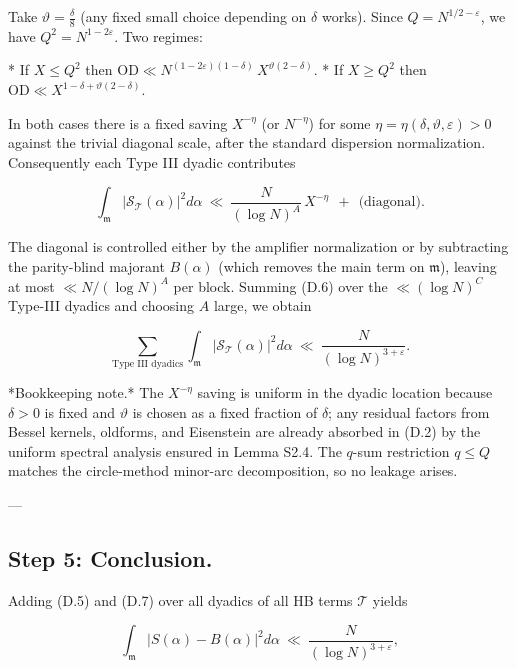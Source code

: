 \documentclass[11pt]{article}
\theoremstyle{definition}
\theoremstyle{remark}
\begin{document}
Take $\vartheta=\tfrac{\delta}{8}$ (any fixed small choice depending on $\delta$ works). Since $Q=N^{1/2-\varepsilon}$, we have $Q^2=N^{1-2\varepsilon}$. Two regimes:

* If $X\le Q^2$ then $\mathrm{OD}\ll N^{(1-2\varepsilon)(1-\delta)}\,X^{\vartheta(2-\delta)}$.
* If $X\ge Q^2$ then $\mathrm{OD}\ll X^{1-\delta+\vartheta(2-\delta)}$.

In both cases there is a fixed saving $X^{-\eta}$ (or $N^{-\eta}$) for some $\eta=\eta(\delta,\vartheta,\varepsilon)>0$ against the trivial diagonal scale, after the standard dispersion normalization. Consequently each Type III dyadic contributes

\begin{equation}
\int_{\mathfrak m}\big|\mathcal S_{\mathcal T}(\alpha)\big|^2 d\alpha
\ \ll\ \frac{N}{(\log N)^{A}}\,X^{-\eta}
\ \ +\ \ \text{(diagonal)}.
\tag{D.6}
\end{equation}

The diagonal is controlled either by the amplifier normalization or by subtracting the parity-blind majorant $B(\alpha)$ (which removes the main term on $\mathfrak m$), leaving at most $\ll N/(\log N)^A$ per block. Summing (D.6) over the $\ll(\log N)^C$ Type-III dyadics and choosing $A$ large, we obtain

\begin{equation}
\sum_{\text{Type III dyadics}}
\int_{\mathfrak m}\big|\mathcal S_{\mathcal T}(\alpha)\big|^2 d\alpha
\ \ll\ \frac{N}{(\log N)^{3+\varepsilon}}.
\tag{D.7}
\end{equation}

*Bookkeeping note.* The $X^{-\eta}$ saving is uniform in the dyadic location because $\delta>0$ is fixed and $\vartheta$ is chosen as a fixed fraction of $\delta$; any residual factors from Bessel kernels, oldforms, and Eisenstein are already absorbed in (D.2) by the uniform spectral analysis ensured in Lemma S2.4. The $q$-sum restriction $q\le Q$ matches the circle-method minor-arc decomposition, so no leakage arises.

---

\subsection*{Step 5: Conclusion.}
Adding (D.5) and (D.7) over all dyadics of all HB terms $\mathcal T$ yields

$$
\int_{\mathfrak m}\big|S(\alpha)-B(\alpha)\big|^2 d\alpha
\ \ll\ \frac{N}{(\log N)^{3+\varepsilon}},
$$
\end{document}
